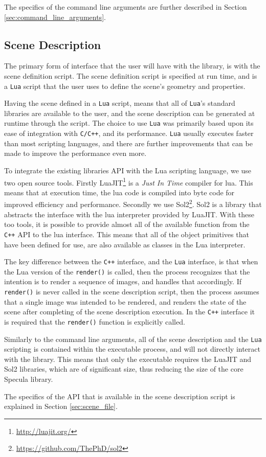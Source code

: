 \documentclass[../pbr.tex]{subfile}
\begin{document}
The specifics of the command line arguments are further described in Section
\ref{sec:command_line_arguments}.

\subsection{Scene Description}%
\label{sub:scene_description}

The primary form of interface that the user will have with the library, is with
the scene definition script. The scene definition script is specified at run
time, and is a \texttt{Lua} script that the user uses to define the scene's
geometry and properties.

Having the scene defined in a \texttt{Lua} script, means that all of
\texttt{Lua}'s standard libraries are available to the user, and the scene
description can be generated at runtime through the script. The choice to use
\texttt{Lua} was primarily based upon its ease of integration with
\texttt{C/C++}, and its performance. \texttt{Lua} usually executes faster than
most scripting languages, and there are further improvements that can be made
to improve the performance even more.

To integrate the existing libraries API with the Lua scripting language, we use
two open source tools. Firstly LuaJIT\footnote{\url{http://luajit.org/}} is a
\textit{Just In Time} compiler for lua. This means that at execution time, the
lua code is compiled into byte code for improved efficiency and performance.
Secondly we use Sol2\footnote{\url{https://github.com/ThePhD/sol2}}. Sol2 is a
library that abstracts the interface with the lua interpreter provided by
LuaJIT. With these too tools, it is possible to provide almost all of the
available function from the \texttt{C++} API to the lua interface. This means
that all of the object primitives that have been defined for use, are also
available as classes in the Lua interpreter.

The key difference between the \texttt{C++} interface, and the \texttt{Lua}
interface, is that when the Lua version of the \texttt{render()} is
called, then the process recognizes that the intention is to render a sequence
of images, and handles that accordingly. If \texttt{render()} is never
called in the scene description script, then the process assumes that a single
image was intended to be rendered, and renders the state of the scene after
completing of the scene description execution. In the \texttt{C++} interface it
is required that the \texttt{render()} function is explicitly called.

Similarly to the command line arguments, all of the scene description and the
\texttt{Lua} scripting is contained within the executable process, and will not
directly interact with the library. This means that only the executable
requires the LuaJIT and Sol2 libraries, which are of significant size, thus
reducing the size of the core Specula library.

The specifics of the API that is available in the scene description script is
explained in Section \ref{sec:scene_file}.
\end{document}
